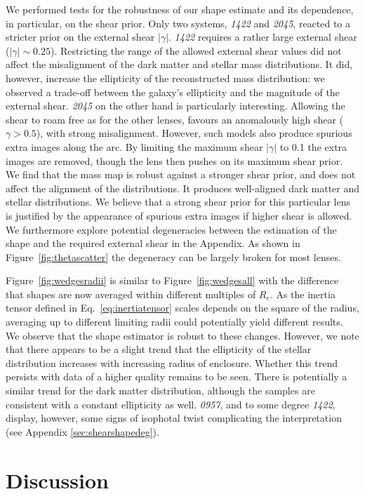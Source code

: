 \documentclass[useAMS,usenatbib]{mn2e}
\begin{document}
We performed tests for the robustness of our shape estimate and its dependence, in particular, on the shear prior. Only two systems, {\it1422} and {\it2045}, reacted to a stricter prior on the external shear $|\gamma|$. {\it1422} requires a rather large external shear ($|\gamma|\sim0.25$). Restricting the range of the allowed external shear values did not affect the misalignment of the dark matter and stellar mass distributions. It did, however, increase the ellipticity of the reconstructed mass distribution: we observed a trade-off between the galaxy's ellipticity and the magnitude of the external shear. {\it2045} on the other hand is particularly interesting. Allowing the shear to roam free as for the other lenses, favours an anomalously high shear ($\gamma > 0.5$), with strong misalignment. However, such models also produce spurious extra images along the arc. By limiting the maximum shear $|\gamma|$ to 0.1 the extra images are removed, though the lens then pushes on its maximum shear prior. We find that the mass map is robust against a stronger shear prior, and does not affect the alignment of the distributions. It produces well-aligned dark matter and stellar distributions. We believe that a strong shear prior for this particular lens is justified by the appearance of spurious extra images if higher shear is allowed. We furthermore explore potential degeneracies between the estimation of the shape and the required external shear in the Appendix. As shown in Figure~\ref{fig:thetascatter} the degeneracy can be largely broken for most lenses.

Figure~\ref{fig:wedgesradii} is similar to Figure~\ref{fig:wedgesall} with the difference that shapes are now averaged within different multiples of $R_e$. As the inertia tensor defined in Eq.~\ref{eq:inertiatensor} scales depends on the square of the radius, averaging up to different limiting radii could potentially yield different results. We observe that the shape estimator is robust to these changes. However, we note that there appears to be a slight trend that the ellipticity of the stellar distribution increases with increasing radius of enclosure. Whether this trend persists with data of a higher quality remains to be seen. There is potentially a similar trend for the dark matter distribution, although the samples are consistent with a constant ellipticity as well. {\it0957}, and to some degree {\it1422}, display, however, some signs of isophotal twist complicating the interpretation (see Appendix \ref{sec:shearshapedeg}).

\section{Discussion}\label{sec:discussion}
\end{document}
